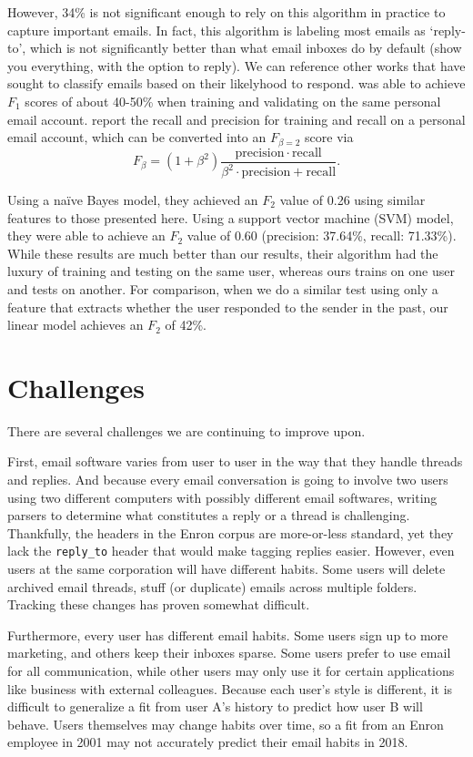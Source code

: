 \documentclass[10pt]{article}
\begin{document}
However, 34\% is not significant enough to rely on this algorithm in practice to capture important emails. In fact, this algorithm is labeling most emails as `reply-to', which is not significantly better than what email inboxes do by default (show you everything, with the option to reply). We can reference other works that have sought to classify emails based on their likelyhood to respond. \cite{knight:2014} was able to achieve $F_1$ scores of about 40-50\% when training and validating on the same personal email account. \cite{bromberg:2013} report the recall and precision for training and recall on a personal email account, which can be converted into an $F_{\beta = 2}$ score via
$$
F_\beta = (1+\beta^2)\frac{\mathrm{precision} \cdot \mathrm{recall}}{\beta^2 \cdot \mathrm{precision} + \mathrm{recall}}.
$$

Using a na\"ive Bayes model, they achieved an $F_2$ value of 0.26 using similar features to those presented here. Using a support vector machine (SVM) model, they were able to achieve an $F_2$ value of 0.60 (precision: 37.64\%,
recall: 71.33\%). While these results are much better than our results, their algorithm had the luxury of training and testing on the same user, whereas ours trains on one user and tests on another. For comparison, when we do a similar test using only a feature that extracts whether the user responded to the sender in the past, our linear model achieves an $F_2$ of 42\%.

\section*{Challenges}

There are several challenges we are continuing to improve upon. 

First, email software varies from user to user in the way that they handle threads and replies. And because every email conversation is going to involve two users using two different computers with possibly different email softwares, writing parsers to determine what constitutes a reply or a thread is challenging. Thankfully, the headers in the Enron corpus are more-or-less standard, yet they lack the \texttt{reply\_to} header that would make tagging replies easier. However, even users at the same corporation will have different habits. Some users will delete archived email threads, stuff (or duplicate) emails across multiple folders. Tracking these changes has proven somewhat difficult.

Furthermore, every user has different email habits. Some users sign up to more marketing, and others keep their inboxes sparse. Some users prefer to use email for all communication, while other users may only use it for certain applications like business with external colleagues. Because each user's style is different, it is difficult to generalize a fit from user A's history to predict how user B will behave. Users themselves may change habits over time, so a fit from an Enron employee in 2001 may not accurately predict their email habits in 2018.
\end{document}
